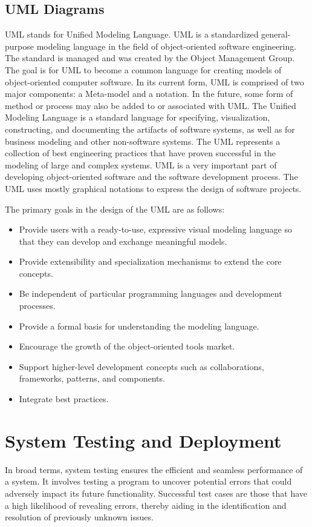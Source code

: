 \documentclass[12pt,a4paper]{report}
\begin{document}
\section{UML Diagrams}
UML stands for Unified Modeling Language. UML is a standardized general-purpose modeling language in the field of object-oriented software engineering. The standard is managed and was created by the Object Management Group. The goal is for UML to become a common language for creating models of object-oriented computer software. In its current form, UML is comprised of two major components: a Meta-model and a notation. In the future, some form of method or process may also be added to or associated with UML.
The Unified Modeling Language is a standard language for specifying, visualization, constructing, and documenting the artifacts of software systems, as well as for business modeling and other non-software systems. The UML represents a collection of best engineering practices that have proven successful in the modeling of large and complex systems. UML is a very important part of developing object-oriented software and the software development process. The UML uses mostly graphical notations to express the design of software projects.

The primary goals in the design of the UML are as follows:
\begin{itemize}
    \item Provide users with a ready-to-use, expressive visual modeling language so that they can develop and exchange meaningful models.
    \item Provide extensibility and specialization mechanisms to extend the core concepts.
    \item Be independent of particular programming languages and development processes.
    \item Provide a formal basis for understanding the modeling language.
    \item Encourage the growth of the object-oriented tools market.
    \item Support higher-level development concepts such as collaborations, frameworks, patterns, and components.
    \item Integrate best practices.
\end{itemize}


\chapter{System Testing and Deployment}
In broad terms, system testing ensures the efficient and seamless performance of a system. It involves testing a program to uncover potential errors that could adversely impact its future functionality. Successful test cases are those that have a high likelihood of revealing errors, thereby aiding in the identification and resolution of previously unknown issues.
\end{document}
